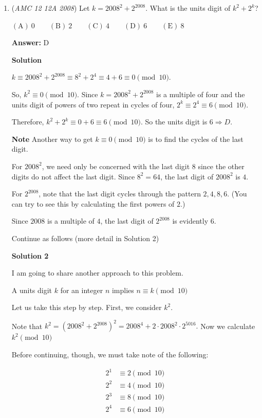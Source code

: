\begin{enumerate}
 


	\item (\textit{AMC 12 12A 2008}) Let $k={2008}^{2}+{2}^{2008}$. What is the units digit of $k^2+2^k$?


 $\mathrm{(A)}\ 0\qquad\mathrm{(B)}\ 2\qquad\mathrm{(C)}\ 4\qquad\mathrm{(D)}\ 6\qquad\mathrm{(E)}\ 8$

 \textbf{Answer: }D



\textbf{Solution}

$k \equiv 2008^2 + 2^{2008} \equiv 8^2 + 2^4 \equiv 4+6 \equiv 0 \pmod{10}$. 

 So, $k^2 \equiv 0 \pmod{10}$. Since $k = 2008^2+2^{2008}$   is a multiple of four and the units digit of powers of two repeat in cycles of four, $2^k \equiv 2^4 \equiv 6 \pmod{10}$. 

 Therefore, $k^2+2^k \equiv 0+6 \equiv 6 \pmod{10}$. So the units digit is $6 \Rightarrow \boxed{D}$.

 \textbf{Note} Another way to get $k \equiv 0 \pmod{10}$ is to find the cycles of the last digit.

 For $2008^2$, we need only be concerned with the last digit $8$ since the other digits do not affect the last digit. Since $8^{2} = 64$, the last digit of $2008^2$ is $4$.

 For $2^{2008}$, note that the last digit cycles through the pattern ${2, 4, 8, 6}$. (You can try to see this by calculating the first powers of $2$.)

 Since $2008$ is a multiple of $4$, the last digit of $2^{2008}$ is evidently $6.$

 Continue as follows (more detail in Solution 2)

 



\textbf{Solution 2}

I am going to share another approach to this problem.

 A units digit $k$ for an integer $n$ implies $n \equiv k \pmod{10}$

 Let us take this step by step. First, we consider $k^2.$

 Note that $k^2 = \left(2008^2 + 2^{2008}\right)^2 = 2008^4 + 2 \cdot 2008^2 \cdot 2^{5016}.$ Now we calculate $k^2 \pmod{10}$

 Before continuing, though, we must take note of the following:

 
 \begin{align*} 2^1 &\equiv 2 \pmod {10} \\ 2^2 &\equiv 4 \pmod {10} \\ 2^3 &\equiv 8 \pmod {10} \\ 2^4 &\equiv 6 \pmod {10} \end{align*}



\end{enumerate}
